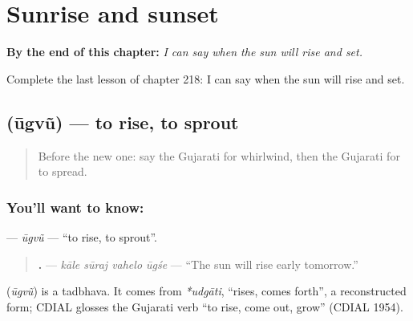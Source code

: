 
\chapter{Sunrise and sunset}
\label{ch:gu-sunrise-and-sunset}

\begin{chapteropening}
\textbf{By the end of this chapter:} \emph{I can say when the sun will rise and set.}

Complete the last lesson of chapter 218: I can say when the sun will rise and set.
\end{chapteropening}

\section[\texorpdfstring{\gu{ઊગવું} (ūgvũ)}{ઊગવું (ūgvũ)}]{ (ūgvũ) — to rise, to sprout}

\label{lesson:GU-C218-ugvu}



\begin{quote}
Before the new one: say the Gujarati for whirlwind, then the Gujarati for to spread.
\end{quote}

\subsection*{You'll want to know: }
\textbf{} — \emph{ūgvũ} — \textquotedblleft{}to rise, to sprout\textquotedblright{}.

\begin{quote}
\textbf{   .} — \emph{kāle sūraj vahelo ūgśe} — \textquotedblleft{}The sun will rise early tomorrow.\textquotedblright{}
\end{quote}

\begin{cousinweb}
\textbf{} (\emph{ūgvũ}) is a tadbhava. It comes from \emph{*udgāti}, \textquotedblleft{}rises, comes forth\textquotedblright{}, a reconstructed form; CDIAL glosses the Gujarati verb \textquotedblleft{}to rise, come out, grow\textquotedblright{} (CDIAL 1954).
\end{cousinweb}

